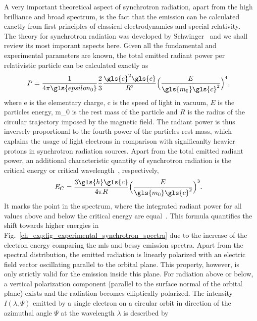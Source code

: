 A very important theoretical aspect of synchrotron radiation, apart from the high brilliance and broad spectrum, is the fact that the emission can be calculated exactly from first principles of classical electrodynamics and special relativity. The theory for synchrotron radiation was developed by Schwinger~\cite{schwinger_classical_1949} and we shall review its most imporant aspects here. Given all the fundamental and experimental parameters are known, the total emitted radiant power per relativistic particle can be calculated exactly as
\begin{align}
 P = \frac{1}{4 \pi \gls{epsilon_0}} \frac{2}{3} \frac{\gls{e}^2 \gls{c}}{R^2}\Big( \frac{E}{\gls{m_0} \gls{c}^2}\Big)^4 \text{,} \label{ch_exp:schwinger_equation_total_power}
\end{align}
where \gls{e} is the elementary charge, \gls{c} is the speed of light in vacuum, $E$ is the particles energy, \gls{m_0} is the rest mass of the particle and $R$ is the radius of the circular trajectory imposed by the magnetic field. The radiant power is thus inversely proportional to the fourth power of the particles rest mass, which explains the usage of light electrons in comparison with significanlty heavier protons in synchrotron radiation sources. Apart from the total emitted radiant power, an additional characteristic quantity of synchrotron radiation is the critical energy or critical wavelength~\cite{schwinger_classical_1949}, respectively,
\begin{align}
 E_C = \frac{3 \gls{h} \gls{c}}{4 \pi R} \Big( \frac{E}{\gls{m_0} \gls{c}^2}\Big)^3 \text{.} \label{ch_exp:characteristic_energy}
\end{align}
It marks the point in the spectrum, where the integrated radiant power for all values above and below the critical energy are equal~\cite{balerna_introduction_2015}. This formula quantifies the shift towards higher energies in Fig.~\ref{ch_exp:fig_experimental_synchrotron_spectra} due to the increase of the electron energy comparing the \gls{mls} and \gls{bessy} emission spectra. Apart from the spectral distribution, the emitted radiation is linearly polarized with an electric field vector oscillating parallel to the orbital plane. This property, however, is only strictly valid for the emission inside this plane. For radiation above or below, a vertical polarization component (parallel to the surface normal of the orbital plane) exists and the radiation becomes elliptically polarized. The intensity $I(\lambda,\Psi)$ emitted by a single electron on a circular orbit in direction of the azimuthal angle $\Psi$ at the wavelength $\lambda$ is described by
